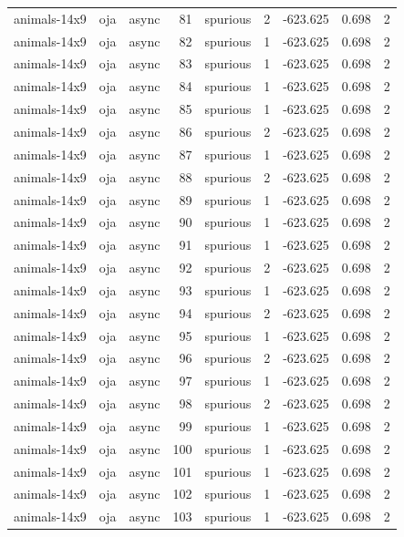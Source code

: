 \begin{tabular}{lllrlrrrr}
animals-14x9 & oja & async & 81 & spurious & 2 & -623.625 & 0.698 & 2 \\
animals-14x9 & oja & async & 82 & spurious & 1 & -623.625 & 0.698 & 2 \\
animals-14x9 & oja & async & 83 & spurious & 1 & -623.625 & 0.698 & 2 \\
animals-14x9 & oja & async & 84 & spurious & 1 & -623.625 & 0.698 & 2 \\
animals-14x9 & oja & async & 85 & spurious & 1 & -623.625 & 0.698 & 2 \\
animals-14x9 & oja & async & 86 & spurious & 2 & -623.625 & 0.698 & 2 \\
animals-14x9 & oja & async & 87 & spurious & 1 & -623.625 & 0.698 & 2 \\
animals-14x9 & oja & async & 88 & spurious & 2 & -623.625 & 0.698 & 2 \\
animals-14x9 & oja & async & 89 & spurious & 1 & -623.625 & 0.698 & 2 \\
animals-14x9 & oja & async & 90 & spurious & 1 & -623.625 & 0.698 & 2 \\
animals-14x9 & oja & async & 91 & spurious & 1 & -623.625 & 0.698 & 2 \\
animals-14x9 & oja & async & 92 & spurious & 2 & -623.625 & 0.698 & 2 \\
animals-14x9 & oja & async & 93 & spurious & 1 & -623.625 & 0.698 & 2 \\
animals-14x9 & oja & async & 94 & spurious & 2 & -623.625 & 0.698 & 2 \\
animals-14x9 & oja & async & 95 & spurious & 1 & -623.625 & 0.698 & 2 \\
animals-14x9 & oja & async & 96 & spurious & 2 & -623.625 & 0.698 & 2 \\
animals-14x9 & oja & async & 97 & spurious & 1 & -623.625 & 0.698 & 2 \\
animals-14x9 & oja & async & 98 & spurious & 2 & -623.625 & 0.698 & 2 \\
animals-14x9 & oja & async & 99 & spurious & 1 & -623.625 & 0.698 & 2 \\
animals-14x9 & oja & async & 100 & spurious & 1 & -623.625 & 0.698 & 2 \\
animals-14x9 & oja & async & 101 & spurious & 1 & -623.625 & 0.698 & 2 \\
animals-14x9 & oja & async & 102 & spurious & 1 & -623.625 & 0.698 & 2 \\
animals-14x9 & oja & async & 103 & spurious & 1 & -623.625 & 0.698 & 2 \\

\end{tabular}
